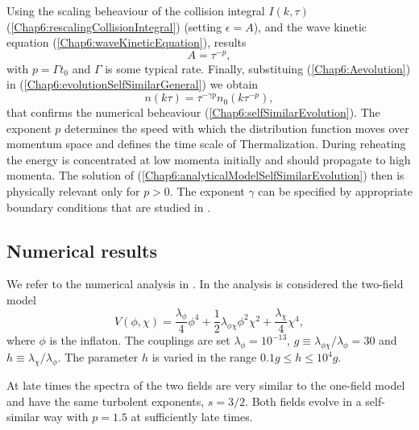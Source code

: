 \documentclass[11pt,a4paper,twoside]{book}
\begin{document}
Using the scaling beheaviour of the collision integral $ I(k,\tau) $ (\ref{Chap6:rescalingCollisionIntegral}) (setting $\epsilon=A$), and the wave kinetic equation (\ref{Chap6:waveKineticEquation}), results
\begin{equation}
	\label{Chap6:Aevolution}
A=\tau^{-p},
\end{equation}
with $ p=\Gamma t_{0} $ and $\Gamma$ is some typical rate. Finally, substituing (\ref{Chap6:Aevolution}) in (\ref{Chap6:evolutionSelfSimilarGeneral}) we obtain 
\begin{equation}
\label{Chap6:analyticalModelSelfSimilarEvolution}
n(k\tau)=\tau^{-\gamma p}n_{0}(k\tau^{-p}),
\end{equation}
that confirms the numerical beheaviour (\ref{Chap6:selfSimilarEvolution}). The exponent $ p $ determines the speed with which the distribution function moves over momentum space and defines the time scale of Thermalization. During reheating the energy is concentrated at low momenta initially and should propagate to high momenta. The solution of (\ref{Chap6:analyticalModelSelfSimilarEvolution}) then is physically relevant only for $ p>0 $. The exponent $\gamma$ can be specified by appropriate boundary conditions that are studied in \cite{Chap6:TurbolentThermalization}.
\subsection{Numerical results}
We refer to the numerical analysis in \cite{Chap6:TurbolentThermalization}. In the analysis is considered the two-field model 
\begin{equation}
\label{Chap6:twoFieldModel}
 V(\phi,\chi)=\frac{\lambda_{\phi}}{4}\phi^{4} + \frac{1}{2}\lambda_{\phi \chi}\phi^{2}\chi^{2} + \frac{\lambda_{\chi}}{4}\chi^{4},
\end{equation}
where $\phi$ is the inflaton. The couplings are set $ \lambda_{\phi}=10^{-13} $, $ g \equiv  \lambda_{\phi \chi}/\lambda_{\phi}=30 $ and $ h \equiv \lambda_{\chi}/\lambda_{\phi} $. The parameter $ h $ is varied in the range $ 0.1 g \le h \le 10^{4} g $.

At late times the spectra of the two fields are very similar to the one-field model and have the same turbolent exponents, $ s=3/2 $. Both fields evolve in a self-similar way with $ p=1.5 $ at sufficiently late times.
\end{document}
